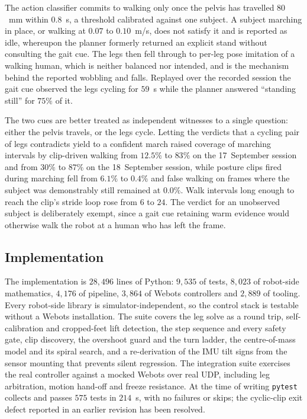 \documentclass[twocolumn]{article}
\begin{document}
The action classifier commits to walking only once the pelvis has travelled $80$~mm within
$0.8$~s, a threshold calibrated against one subject. A subject marching in place, or walking at
$0.07$ to $0.10$~m/s, does not satisfy it and is reported as idle, whereupon the planner
formerly returned an explicit stand without consulting the gait cue. The legs then fell through
to per-leg pose imitation of a walking human, which is neither balanced nor intended, and is
the mechanism behind the reported wobbling and falls. Replayed over the recorded session the
gait cue observed the legs cycling for $59$~s while the planner answered ``standing still'' for
$75\%$ of it.

The two cues are better treated as independent witnesses to a single question: either the
pelvis travels, or the legs cycle. Letting the verdicts that a cycling pair of legs contradicts
yield to a confident march raised coverage of marching intervals by clip-driven walking from $12.5\%$ to
$83\%$ on the 17~September session and from $30\%$ to $87\%$ on the 18~September session, while
posture clips fired during marching fell from $6.1\%$ to $0.4\%$ and false walking on frames
where the subject was demonstrably still remained at $0.0\%$. Walk intervals long enough to
reach the clip's stride loop rose from $6$ to $24$. The verdict for an unobserved subject is
deliberately exempt, since a gait cue retaining warm evidence would otherwise walk the robot at
a human who has left the frame.

\subsection{Implementation}

The implementation is $28{,}496$ lines of Python: $9{,}535$ of tests, $8{,}023$ of robot-side
mathematics, $4{,}176$ of pipeline, $3{,}864$ of Webots controllers and $2{,}889$ of tooling.
Every robot-side library is simulator-independent, so the control stack is testable without a
Webots installation. The suite covers the leg solve as a round trip, self-calibration and
cropped-feet lift detection, the step sequence and every safety gate, clip discovery, the
overshoot guard and the turn ladder, the centre-of-mass model and its spiral search, and a
re-derivation of the IMU tilt signs from the sensor mounting that prevents silent regression.
The integration suite exercises the real controller against a mocked Webots over real UDP,
including leg arbitration, motion hand-off and freeze resistance. At the time of writing
\texttt{pytest} collects and passes $575$ tests in $214$~s, with no failures or skips; the
cyclic-clip exit defect reported in an earlier revision has been resolved.
\end{document}
